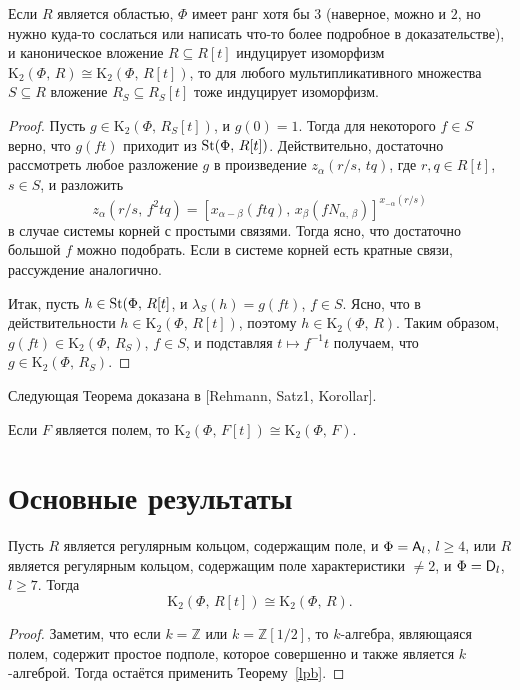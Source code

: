 \documentclass[12pt,a4paper]{article}
\begin{document}
\begin{lemma}
\label{k2hil}
Если $R$ является областью, $\Phi$ имеет ранг хотя бы $3$ {\rm(}наверное, можно и $2$, но нужно куда-то сослаться или написать что-то более подробное в доказательстве{\rm)}, и каноническое вложение $R\subseteq R[t]$ индуцирует изоморфизм $\mathrm K_2(\Phi,\,R)\cong\mathrm K_2(\Phi,\,R[t])$, то для любого мультипликативного множества $S\subseteq R$ вложение $R_S\subseteq R_S[t]$ тоже индуцирует изоморфизм.
\end{lemma}
\begin{proof}
Пусть $g\in\mathrm K_2(\Phi,\,R_S[t])$, и $g(0)=1$. Тогда для некоторого $f\in S$ верно, что $g(ft)$ приходит из $\mathop{\mathrm{St}}\nolimits(\Phi,\,R[t])$. Действительно, достаточно рассмотреть любое разложение $g$ в произведение $z_{\alpha}(r/s,\,tq)$, где $r,q\in R[t]$, $s\in S$, и разложить
$$
z_{\alpha}(r/s,\,f^2tq)=[x_{\alpha-\beta}(ftq),\,x_{\beta}(fN_{\alpha,\,\beta})]^{x_{-\alpha}(r/s)}
$$
в случае системы корней с простыми связями. Тогда ясно, что достаточно большой $f$ можно подобрать. Если в системе корней есть кратные связи, рассуждение аналогично.

Итак, пусть $h\in\mathop{\mathrm{St}}\nolimits(\Phi,\,R[t]$, и $\lambda_S(h)=g(ft)$, $f\in S$. Ясно, что в действительности $h\in\mathrm K_2(\Phi,\,R[t])$, поэтому $h\in\mathrm K_2(\Phi,\,R)$. Таким образом, $g(ft)\in\mathrm K_2(\Phi,\,R_S)$, $f\in S$, и подставляя $t\mapsto f^{-1}t$ получаем, что $g\in\mathrm K_2(\Phi,\,R_S)$.
\end{proof}

Следующая Теорема доказана в [Rehmann, Satz1, Korollar].

\begin{theorem}
Если $F$ является полем, то $\mathrm K_2(\Phi,\,F[t])\cong\mathrm K_2(\Phi,\,F)$.
\end{theorem}

\section{Основные результаты}

\begin{theorem}
Пусть $R$ является регулярным кольцом, содержащим поле, и $\Phi=\mathsf{A}_l$, $l\geq4$, или $R$ является регулярным кольцом, содержащим поле характеристики $\neq2$, и $\Phi=\mathsf{D}_l$, $l\geq7$. Тогда
$$
\mathrm K_2(\Phi,\,R[t])\cong\mathrm K_2(\Phi,\,R).
$$
\end{theorem}
\begin{proof}
Заметим, что если $k=\mathbb Z$ или $k=\mathbb Z[1/2]$, то $k$-алгебра, являющаяся полем, содержит простое подполе, которое совершенно и также является $k$-алгеброй. Тогда остаётся применить Теорему~\ref{lpb}.
\end{proof}
\end{document}
